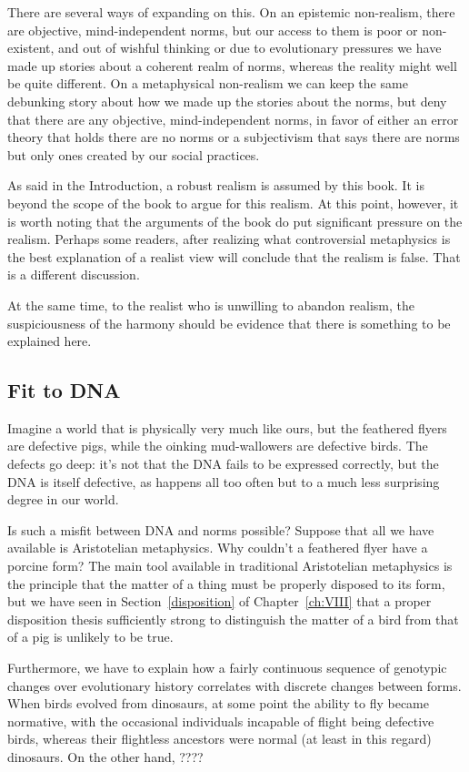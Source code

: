There are several ways of expanding on this. On an epistemic non-realism, there are objective, mind-independent norms, but 
our access to them is poor or non-existent, and out of wishful thinking or due to evolutionary pressures we have made 
up stories about a coherent realm of norms, whereas the reality might well be quite different. On a metaphysical non-realism 
we can keep the same debunking story about how we made up the stories about the norms, but deny that there are any 
objective, mind-independent norms, in favor of either an error theory that holds there are no norms or a subjectivism
that says there are norms but only ones created by our social practices. 

As said in the Introduction, a robust realism is assumed by this book. It is beyond the scope of the book to argue for 
this realism. At this point, however, it is worth noting that the arguments of the book do put significant pressure 
on the realism. Perhaps some readers, after realizing what controversial metaphysics is the best explanation of a realist
view will conclude that the realism is false. That is a different discussion.

At the same time, to the realist who is unwilling to abandon realism, the suspiciousness of the harmony should be 
evidence that there is something to be explained here. 

\subsection{Fit to DNA}
Imagine a world that is physically very much like ours, but the feathered flyers are defective
pigs, while the oinking mud-wallowers are defective birds. The defects go deep: it's not that the DNA fails
to be expressed correctly, but the DNA is itself defective, as happens all too often but to a much less
surprising degree in our world.

Is such a misfit between DNA and norms possible? Suppose that all we have available is Aristotelian metaphysics.
Why couldn't a feathered flyer have a porcine form? The main tool available in traditional Aristotelian metaphysics
is the principle that the matter of a thing must be properly disposed to its form, but we have seen in Section~\ref{disposition}
of Chapter~\ref{ch:VIII} that a proper disposition thesis sufficiently strong to distinguish the matter of a bird from 
that of a pig is unlikely to be true. 

Furthermore, we have to explain how a fairly continuous sequence of genotypic changes over evolutionary history 
correlates with discrete changes between forms. When birds evolved from dinosaurs, at some point the ability to 
fly became normative, with the occasional individuals incapable of flight being defective birds, whereas their flightless 
ancestors were normal (at least in this regard) dinosaurs. On the other hand, ????

